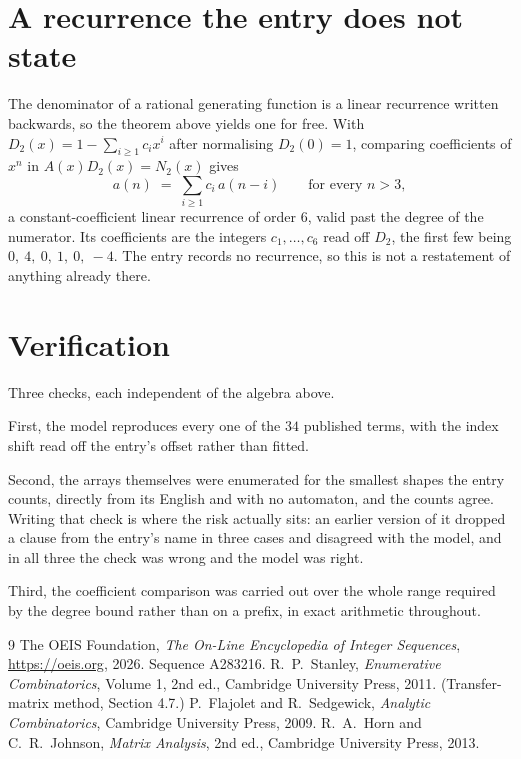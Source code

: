 \documentclass[11pt,a4paper]{article}
\theoremstyle{plain}
\theoremstyle{definition}
\begin{document}
\section{A recurrence the entry does not state}

The denominator of a rational generating function is a linear recurrence written backwards, so
the theorem above yields one for free. With $D_2(x)=1-\sum_{i\ge1}c_ix^i$ after normalising
$D_2(0)=1$, comparing coefficients of $x^n$ in $A(x)D_2(x)=N_2(x)$ gives
\[
a(n)\;=\;\sum_{i\ge1}c_i\,a(n-i)\qquad\text{for every }n>3,
\]
a constant-coefficient linear recurrence of order $6$, valid past the degree of the
numerator. Its coefficients are the integers $c_1,\dots,c_{6}$ read off $D_2$, the first few being $0,\ 4,\ 0,\ 1,\ 0,\ -4$. The entry records no recurrence, so this is not a restatement of anything
already there.

\section{Verification}

Three checks, each independent of the algebra above.

First, the model reproduces every one of the $34$ published terms, with the index shift
read off the entry's offset rather than fitted.

Second, the arrays themselves were enumerated for the smallest shapes the entry counts,
directly from its English and with no automaton, and the counts agree. Writing that check is
where the risk actually sits: an earlier version of it dropped a clause from the entry's name
in three cases and disagreed with the model, and in all three the check was wrong and the model
was right.

Third, the coefficient comparison was carried out over the whole range required by the degree
bound rather than on a prefix, in exact arithmetic throughout.

\begin{thebibliography}{9}
 The OEIS Foundation, \emph{The On-Line Encyclopedia of Integer
Sequences}, \url{https://oeis.org}, 2026. Sequence A283216.
 R.~P.~Stanley, \emph{Enumerative Combinatorics}, Volume 1, 2nd ed.,
Cambridge University Press, 2011. (Transfer-matrix method, Section 4.7.)
 P.~Flajolet and R.~Sedgewick, \emph{Analytic Combinatorics}, Cambridge
University Press, 2009.
 R.~A.~Horn and C.~R.~Johnson, \emph{Matrix Analysis}, 2nd ed., Cambridge
University Press, 2013.
\end{thebibliography}
\end{document}
